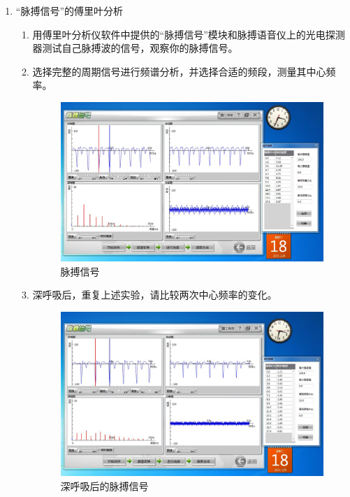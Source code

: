 \documentclass[11pt]{article}
\begin{document}
\begin{enumerate}
    \item “脉搏信号”的傅里叶分析
    \begin{enumerate}
        \item 用傅里叶分析仪软件中提供的“脉搏信号”模块和脉搏语音仪上的光电探测器测试自己脉搏波的信号，观察你的脉搏信号。
        \item 选择完整的周期信号进行频谱分析，并选择合适的频段，测量其中心频率。
        \begin{figure}[H]
            \centering
            \includegraphics[width=15cm]{Fig/图9 脉搏信号.JPG}
            \caption{脉搏信号}
        \end{figure}
        \item 深呼吸后，重复上述实验，请比较两次中心频率的变化。
        \begin{figure}[H]
            \centering
            \includegraphics[width=15cm]{Fig/图10 深呼吸后的脉搏信号.JPG}
            \caption{深呼吸后的脉搏信号}
        \end{figure}
    \end{enumerate}


\end{enumerate}
\end{document}
